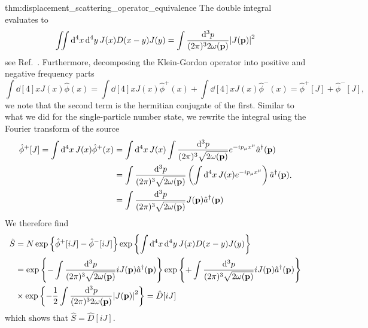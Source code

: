 \begin{delayedproof}{thm:displacement_scattering_operator_equivalence}
	The double integral evaluates to
	\begin{equation*}
		\iint\dd[4]{x}\dd[4]{y}
		J(x)
		D(x-y)
		J(y)
		=
		\int\frac{\dd[3]{p}}{(2\pi)^32\omega(\vb{p})}
		\abs{J(\vb{p})}^2
	\end{equation*}
	see Ref.~\cite[p.~26]{Zee2010}.
	Furthermore, decomposing the Klein-Gordon operator into positive and negative frequency parts
	\begin{equation*}
		\int\dd[4]{x}
		J(x)
		\hat\phi(x)
		=
		\int\dd[4]{x}
		J(x)
		\hat\phi^+(x)
		+
		\int\dd[4]{x}
		J(x)
		\hat\phi^-(x)
		=
		\hat\phi^+[J]
		+
		\hat\phi^-[J]
		,
	\end{equation*}
	we note that the second term is the hermitian conjugate of the first.
	Similar to what we did for the single-particle number state, we rewrite the integral using the Fourier transform of the source
	\begin{equation*}
		\begin{split}
			\hat\phi^+[J]
			=
			\int\dd[4]{x}
			J(x)
			\hat\phi^+(x)
			&=
			\int\dd[4]{x}
			J(x)
			\int\frac{\dd[3]{p}}{(2\pi)^3\sqrt{2\omega(\vb{p})}}
			e^{-ip_\mu x^\mu}
			\hat{a}^\dagger(\vb{p})
			\\
			&=
			\int\frac{\dd[3]{p}}{(2\pi)^3\sqrt{2\omega(\vb{p})}}
			\left(
				\int\dd[4]{x}
				J(x)
				e^{-ip_\mu x^\mu}
			\right)
			\hat{a}^\dagger(\vb{p})
			\\
			&=
			\int\frac{\dd[3]{p}}{(2\pi)^3\sqrt{2\omega(\vb{p})}}
			J(\vb{p})
			\hat{a}^\dagger(\vb{p})
		\end{split}
		.
	\end{equation*}
	We therefore find
	\begin{equation*}
		\begin{split}
			\hat{S}
			&=
			N\exp\left\{
				\hat\phi^+[iJ]
				-
				\hat\phi^-[iJ]
			\right\}
			\exp\left\{
				\int\dd[4]{x}\dd[4]{y}
				J(x)
				D(x-y)
				J(y)
			\right\}
			\\
			&=
			\exp\left\{
				-
				\int\frac{\dd[3]{p}}{(2\pi)^3\sqrt{2\omega(\vb{p})}}
				iJ(\vb{p})
				\hat{a}^\dagger(\vb{p})
			\right\}
			\exp\left\{
				+
				\int\frac{\dd[3]{p}}{(2\pi)^3\sqrt{2\omega(\vb{p})}}
				iJ(\vb{p})
				\hat{a}^\dagger(\vb{p})
			\right\}
			\\
			&\times
			\exp\left\{
				-
				\frac{1}{2}
				\int\frac{\dd[3]{p}}{(2\pi)^32\omega(\vb{p})}
				\abs{J(\vb{p})}^2
			\right\}
			=
			\hat{D}[iJ]
		\end{split}
	\end{equation*}
	which shows that $\hat{S}=\hat{D}[iJ]$.
\end{delayedproof}

